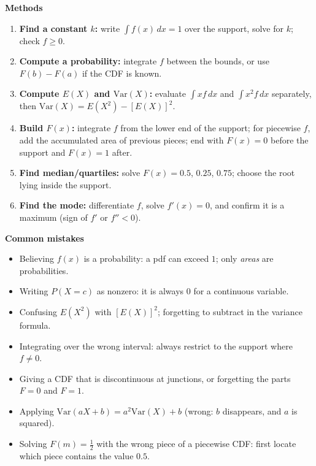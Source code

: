 \documentclass[11pt]{article}
\newcommand{\cle}[1]{{\popxbold\color{popdark}#1}}
\begin{document}
\begin{bilan}
\textbf{Methods}\par
\begin{enumerate}
\item \textbf{Find a constant $k$:} write $\int f(x)\,dx=1$ over the support, solve for $k$; check $f\ge 0$.
\item \textbf{Compute a probability:} integrate $f$ between the bounds, or use $F(b)-F(a)$ if the CDF is known.
\item \textbf{Compute $E(X)$ and $\mathrm{Var}(X)$:} evaluate $\int xf\,dx$ and $\int x^2 f\,dx$ separately, then $\mathrm{Var}(X)=E(X^2)-[E(X)]^2$.
\item \textbf{Build $F(x)$:} integrate $f$ from the lower end of the support; for piecewise $f$, add the accumulated area of previous pieces; end with $F(x)=0$ before the support and $F(x)=1$ after.
\item \textbf{Find median/quartiles:} solve $F(x)=0.5$, $0.25$, $0.75$; choose the root lying inside the support.
\item \textbf{Find the mode:} differentiate $f$, solve $f'(x)=0$, and confirm it is a maximum (sign of $f'$ or $f''<0$).
\end{enumerate}

\textbf{Common mistakes}\par
\begin{itemize}
\item Believing $f(x)$ is a probability: a pdf can exceed $1$; only \emph{areas} are probabilities.
\item Writing $P(X=c)$ as nonzero: it is always $0$ for a continuous variable.
\item Confusing $E(X^2)$ with $[E(X)]^2$; forgetting to subtract in the variance formula.
\item Integrating over the wrong interval: always restrict to the \cle{support} where $f\neq 0$.
\item Giving a CDF that is discontinuous at junctions, or forgetting the parts $F=0$ and $F=1$.
\item Applying $\mathrm{Var}(aX+b)=a^2\mathrm{Var}(X)+b$ (wrong: $b$ disappears, and $a$ is squared).
\item Solving $F(m)=\tfrac12$ with the wrong piece of a piecewise CDF: first locate which piece contains the value $0.5$.
\end{itemize}


\end{bilan}
\end{document}
